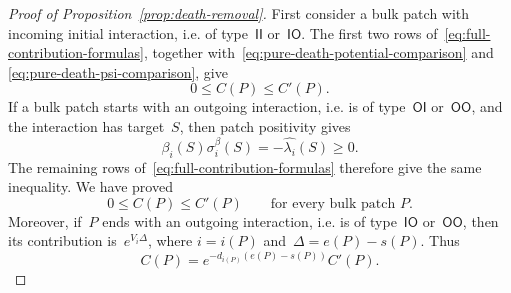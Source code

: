 \documentclass[EJP,preprint,NODS,nobera]{ejpecp}
\newcommand{\bb}[1]{\left(#1\right)}
\begin{document}
\begin{proof}[Proof of Proposition~\ref{prop:death-removal}]
First consider a bulk patch with incoming initial interaction, i.e. of type~$\mathsf{II}$ or~$\mathsf{IO}$. The first two
rows of~\eqref{eq:full-contribution-formulas},
together with~\eqref{eq:pure-death-potential-comparison} and
\eqref{eq:pure-death-psi-comparison}, give
\begin{equation*}
0\leq C(P)\leq C'(P).
\end{equation*}
If a bulk patch starts with an outgoing interaction, i.e. is of type~$\mathsf{OI}$ or~$\mathsf{OO}$, and the interaction has target~$S$, then patch positivity gives
\begin{equation*}
\beta_i(S)\sigma_i^\beta(S)
=
-\widehat{\lambda_i}(S)
\geq0.
\end{equation*}
The remaining rows of~\eqref{eq:full-contribution-formulas} therefore give the
same inequality. We have proved
\begin{equation}
\label{eq:pure-death-bulk-patch-comparison}
0\leq C(P)\leq C'(P)
\qquad
\text{for every bulk patch }P.
\end{equation}
Moreover, if~$P$ ends with an outgoing interaction, i.e. is of type~$\mathsf{IO}$ or~$\mathsf{OO}$, then its contribution is~$e^{V_i\Delta}$, where
$i=i(P)$ and~$\Delta=e(P)-s(P)$. Thus
\begin{equation}
\label{eq:pure-death-outgoing-terminal-factor}
C(P)
=
e^{-d_{i(P)}\bb{e(P)-s(P)}}C'(P).
\end{equation}


\end{proof}
\end{document}
